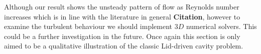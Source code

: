 Although our result shows the unsteady pattern of flow as Reynolds number increases which is in line with the literature in general \textbf{Citation}, however to examine the turbulent behaviour we should implement $3D$ numerical solvers. This could be a further investigation in the future. Once again this section is only aimed to be a qualitative illustration of the classic Lid-driven cavity problem. 